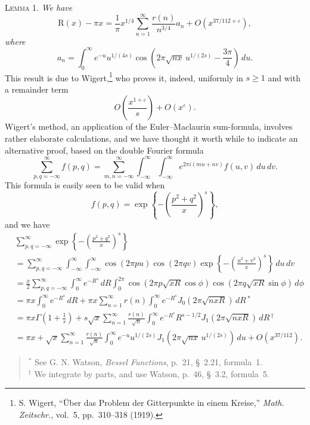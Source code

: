 \documentclass[11pt]{article}
\newcommand{\dd}{\,d}
\begin{document}
\medskip
\noindent\textsc{Lemma 1.} \textit{We have}
\[
 \mathrm{R}(x)-\pi x
 =\frac1\pi x^{1/4}\sum_{n=1}^{\infty}\frac{r(n)}{n^{3/4}}a_n
  +O\!\left(x^{37/112+\varepsilon}\right),
\]
\textit{where}
\begin{equation}
 a_n=\int_0^\infty e^{-u}u^{1/(4s)}
 \cos\!\left(2\pi\sqrt{nx}\,u^{1/(2s)}-\frac{3\pi}{4}\right)\dd u.
 \tag{2.1}
\end{equation}
This result is due to Wigert,\footnote{S. Wigert, ``Über das Problem der
Gitterpunkte in einem Kreise,'' \textit{Math. Zeitschr.}, vol.~5,
pp.~310--318 (1919).} who proves it, indeed, uniformly in $s\geq1$ and with
a remainder term
\[
 O\!\left(\frac{x^{1+\varepsilon}}s\right)+O\!\left(x^\varepsilon\right).
\]
Wigert's method, an application of the Euler--Maclaurin sum-formula, involves
rather elaborate calculations, and we have thought it worth while to
indicate an alternative proof, based on the double Fourier formula
\[
 \sum_{p,q=-\infty}^{\infty}f(p,q)
 =\sum_{m,n=-\infty}^{\infty}\int_{-\infty}^{\infty}
  \int_{-\infty}^{\infty}e^{2\pi i(mu+nv)}f(u,v)\dd u\dd v.
\]
This formula is easily seen to be valid when
\[
 f(p,q)=\exp\!\left\{-\left(\frac{p^2+q^2}{x}\right)^s\right\},
\]
and we have
\begin{align*}
&\sum_{p,q=-\infty}^{\infty}
 \exp\!\left\{-\left(\frac{p^2+q^2}{x}\right)^s\right\} \\
&=\sum_{p,q=-\infty}^{\infty}\int_{-\infty}^{\infty}
  \int_{-\infty}^{\infty}
 \cos(2\pi pu)\cos(2\pi qv)
 \exp\!\left\{-\left(\frac{u^2+v^2}{x}\right)^s\right\}\dd u\dd v \\
&=\frac{x}{2}\sum_{p,q=-\infty}^{\infty}\int_0^\infty e^{-R^s}\dd R
 \int_0^{2\pi}
 \cos\!\left(2\pi p\sqrt{xR}\cos\phi\right)
 \cos\!\left(2\pi q\sqrt{xR}\sin\phi\right)\dd\phi \\
&=\pi x\int_0^\infty e^{-R^s}\dd R
 +\pi x\sum_{n=1}^{\infty}r(n)\int_0^\infty e^{-R^s}
 J_0\!\left(2\pi\sqrt{nxR}\right)\dd R\,^{*} \\
&=\pi x\Gamma\!\left(1+\frac1s\right)
 +s\sqrt{x}\sum_{n=1}^{\infty}\frac{r(n)}{\sqrt n}
 \int_0^\infty e^{-R^s}R^{s-1/2}
 J_1\!\left(2\pi\sqrt{nxR}\right)\dd R\,^{\dagger} \\
&=\pi x+\sqrt{x}\sum_{n=1}^{\infty}\frac{r(n)}{\sqrt n}
 \int_0^\infty e^{-u}u^{1/(2s)}
 J_1\!\left(2\pi\sqrt{nx}\,u^{1/(2s)}\right)\dd u
 +O\!\left(x^{37/112}\right).
 \tag{2.2}
\end{align*}
\begin{quote}\small
$^{*}$ See G. N. Watson, \textit{Bessel Functions}, p.~21, \S~2.21,
formula~1.\\
$^{\dagger}$ We integrate by parts, and use Watson, p.~46, \S~3.2,
formula~5.
\end{quote}
\end{document}

